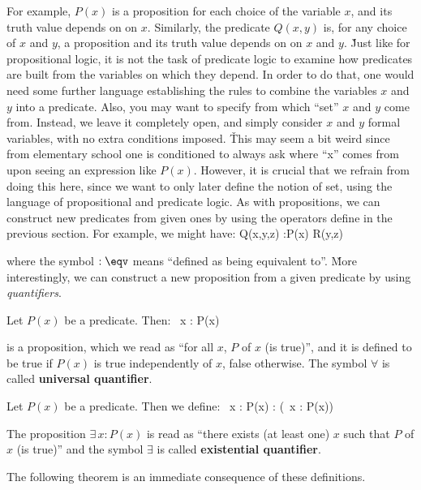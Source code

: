 For example, $P(x)$ is a proposition for each choice of the variable $x$, and its truth value depends on on $x$.
Similarly, the predicate $Q(x,y)$ is, for any choice of $x$ and $y$, a proposition and its truth value depends on on
$x$ and $y$. \v

Just like for propositional logic, it is not the task of predicate logic to examine how predicates are built from the
variables on which they depend. In order to do that, one would need some further language establishing the rules to
combine the variables $x$ and $y$ into a predicate. Also, you may want to specify from which ``set'' $x$ and $y$ come
from. Instead, we leave it completely open, and simply consider $x$ and $y$ formal variables, with no extra
conditions imposed. \v

This may seem a bit weird since from elementary school one is conditioned to always ask where ``x'' comes from upon
seeing an expression like $P(x)$. However, it is crucial that we refrain from doing this here, since we want to only
later define the notion of set, using the language of propositional and predicate logic. As with propositions, we can
construct new predicates from given ones by using the operators define in the previous section. For example, we might
have:
\bse
Q(x,y,z) :\eqv P(x) \land R(y,z)
\ese

where the symbol $:\eqv$ means ``defined as being equivalent to''. \v

More interestingly, we can construct a new proposition from a given predicate by using \emph{quantifiers}.

Let $P(x)$ be a predicate. Then:
\bse
\forall \, x : P(x)
\ese

is a proposition, which we read as ``for all $x$, $P$ of $x$ (is true)'', and it is defined to be true if $P(x)$ is
true independently of $x$, false otherwise. The symbol $\forall$\index{$\forall$} is called \textbf{universal
quantifier}.
\ed

Let $P(x)$ be a predicate. Then we define:
\bse
\exists \, x : P(x) : \eqv \neg (\forall \, x : \neg P(x))
\ese

The proposition $\exists \, x : P(x)$ is read as ``there exists (at least one) $x$ such that $P$ of $x$ (is true)''
and the symbol $\exists$\index{$\exists$} is called \textbf{existential quantifier}.
\ed

The following theorem is an immediate consequence of these definitions.

